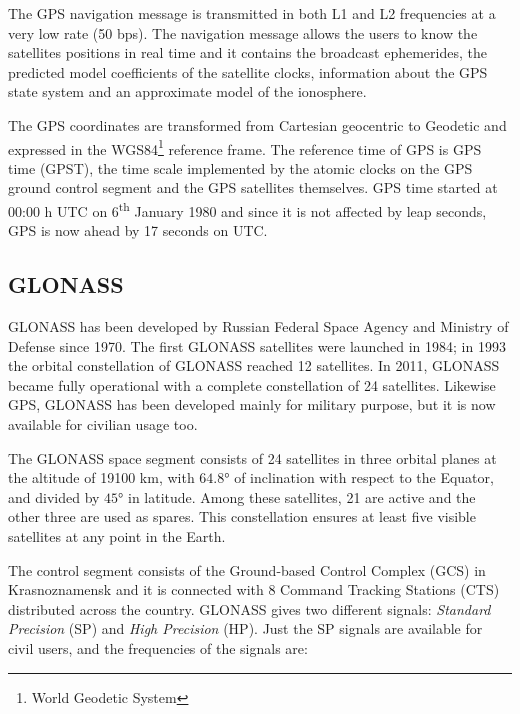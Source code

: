 The GPS navigation message is transmitted in both L1 and L2 frequencies at a very low rate (50 bps). The navigation message allows the users to know the satellites positions in real time and it contains the broadcast ephemerides, the predicted model coefficients of the satellite clocks, information about the GPS state system and an approximate model of the ionosphere.

The GPS coordinates are transformed from Cartesian geocentric to Geodetic and expressed in the WGS84\footnote{World Geodetic System} reference frame. The reference time of GPS is GPS time (GPST), the time scale implemented by the atomic clocks on the GPS ground control segment and the GPS satellites themselves. GPS time started at 00:00 h UTC on 6\textsuperscript{th} January 1980 and since it is not affected by leap seconds, GPS is now ahead by 17 seconds on UTC.



\subsection{GLONASS}

GLONASS has been developed by Russian Federal Space Agency and Ministry of Defense since 1970.
The first GLONASS satellites were launched in 1984; in 1993 the orbital constellation of GLONASS
reached 12 satellites. In 2011, GLONASS became fully operational with a complete constellation of 24 satellites. Likewise GPS, GLONASS has been developed mainly for military purpose, but it is now available for civilian usage too. 

The GLONASS space segment consists of 24 satellites in three orbital planes at the altitude of 19100 km, with $\ang{64.8}$ of inclination with respect to the Equator, and divided by $\ang{45}$ in latitude. Among these satellites, 21 are active and the other three are used as spares. This constellation ensures at least five visible satellites at any point in the Earth.

The control segment consists of the Ground-based Control Complex (GCS) in Krasnoznamensk and it is connected with 8 Command Tracking Stations (CTS) distributed across the country.
GLONASS gives two different signals: \textit{Standard Precision} (SP) and \textit{High Precision} (HP). Just the SP signals are available for civil users, and the frequencies of the signals are:

